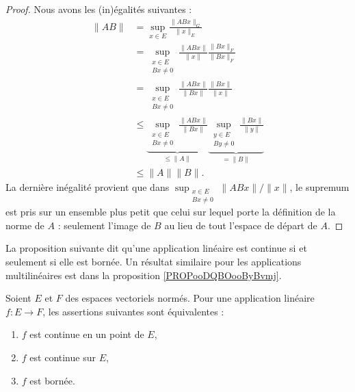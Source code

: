 \begin{proof}
	Nous avons les (in)égalités suivantes :
	\begin{subequations}
		\begin{align}
			\| AB \| & =\sup_{x\in E}\frac{ \| ABx \|_G }{ \| x \|_E } \\
			         & =\sup_{\substack{x\in E                         \\Bx\neq 0}}\frac{ \| ABx \| }{ \| x \| }\frac{ \| Bx \|_F }{ \| Bx \|_F }\\
			         & =\sup_{\substack{x\in E                         \\Bx\neq 0}}\frac{ \| ABx \| }{ \| Bx \| }\frac{ \| Bx \| }{ \| x \| }\\
			         & \leq\underbrace{\sup_{\substack{x\in E          \\Bx\neq 0}}\frac{ \| ABx \| }{ \| Bx \| }}_{\leq\| A \|}\underbrace{\sup_{\substack{y\in E\\By\neq 0}}\frac{ \| Bx \| }{ \| y \| }}_{=\| B \|}\\
			         & \leq \| A \|\| B \|.
		\end{align}
	\end{subequations}
	La dernière inégalité provient que dans \( \sup_{\substack{x\in E\\Bx\neq 0}}\| ABx \|/\| x \|\), le supremum est pris sur un ensemble plus petit que celui sur lequel porte la définition de la norme de \( A\) : seulement l'image de \( B\) au lieu de tout l'espace de départ de \( A\).
\end{proof}

La proposition suivante dit qu'une application linéaire est continue si et seulement si elle est bornée. Un résultat similaire pour les applications multilinéaires est dans la proposition \ref{PROPooDQBOooByBvmj}.

\begin{theorem}      \label{ThoCaMpKO}     \label{PROPooQZYVooYJVlBd}
	Soient \( E\) et \( F\) des espaces vectoriels normés. Pour une application linéaire \( f\colon E\to F\), les assertions suivantes sont équivalentes :
	\begin{enumerate}
		\item		\label{ITEMooIQDEooUVuQxu}
		      \( f\) est continue en un point de \( E\),
		\item		\label{ITEMooQMQPooXCyQXyBV}
		      \( f\) est continue sur \( E\),
		\item		\label{ITEMooBOYYooGjePma}
		      \( f\) est bornée.
	\end{enumerate}
\end{theorem}

